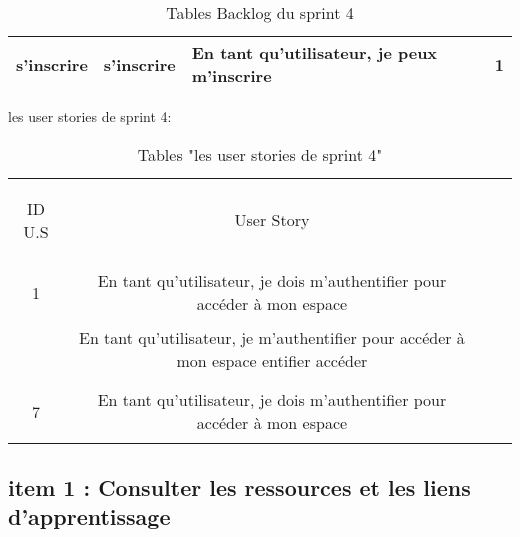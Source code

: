 \begin{table}[]
\begin{tabular}{|l|l|l|l|}
		\textbf{s'inscrire}                    & s'inscrire                                                            & En tant qu'utilisateur, je peux m'inscrire                                                                        & 1    \\ \hline
	\end{tabular}
	
	
	\caption{Tables Backlog du sprint 4}
	\label{Tables Backlog du sprint 4}
\end{table}










\begin{table}[h]
{\Large \color{cyan} les user stories de sprint 4:}
	
	\begin{center}
		\begin{tabular}{>{\begin{bf} } c <{\end{bf}}ccc}
			
			\rowcolor{-blue!20!red}ID U.S & \begin{bf}User Story \end{bf}  & \\
			
			1 & En tant qu’utilisateur, je dois m’authentifier pour accéder à mon espace \\
			& En tant qu’utilisateur, je  m’authentifier pour accéder à mon espace entifier accéder
			\\
			& \\
			7 & En tant qu’utilisateur, je dois m’authentifier pour accéder à mon espace \\
			
			
		\end{tabular}
	\end{center}
	\caption{Tables  "les user stories de sprint 4"}
	\label{les user stories de sprint 4}
\end{table}



\clearpage
\clearpage
\subsection{item 1 : Consulter les ressources et les liens d'apprentissage}
